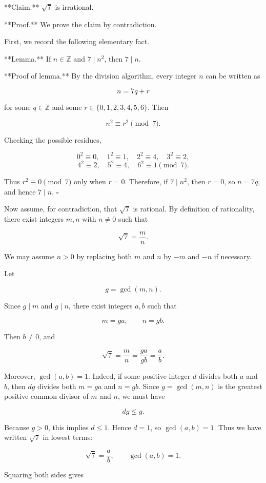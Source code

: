 **Claim.** \(\sqrt{7}\) is irrational.

**Proof.** We prove the claim by contradiction.

First, we record the following elementary fact.

**Lemma.** If \(n\in \mathbb Z\) and \(7\mid n^2\), then \(7\mid n\).

**Proof of lemma.** By the division algorithm, every integer \(n\) can be written as

\[
n=7q+r
\]

for some \(q\in \mathbb Z\) and some \(r\in \{0,1,2,3,4,5,6\}\). Then

\[
n^2 \equiv r^2 \pmod 7.
\]

Checking the possible residues,

\[
0^2\equiv 0,\quad 1^2\equiv 1,\quad 2^2\equiv 4,\quad 3^2\equiv 2,
\]
\[
4^2\equiv 2,\quad 5^2\equiv 4,\quad 6^2\equiv 1 \pmod 7.
\]

Thus \(r^2\equiv 0\pmod 7\) only when \(r=0\). Therefore, if \(7\mid n^2\), then \(r=0\), so \(n=7q\), and hence \(7\mid n\). \(\square\)

Now assume, for contradiction, that \(\sqrt{7}\) is rational. By definition of rationality, there exist integers \(m,n\) with \(n\neq 0\) such that

\[
\sqrt{7}=\frac{m}{n}.
\]

We may assume \(n>0\) by replacing both \(m\) and \(n\) by \(-m\) and \(-n\) if necessary.

Let

\[
g=\gcd(m,n).
\]

Since \(g\mid m\) and \(g\mid n\), there exist integers \(a,b\) such that

\[
m=ga,\qquad n=gb.
\]

Then \(b\neq 0\), and

\[
\sqrt{7}=\frac{m}{n}=\frac{ga}{gb}=\frac{a}{b}.
\]

Moreover, \(\gcd(a,b)=1\). Indeed, if some positive integer \(d\) divides both \(a\) and \(b\), then \(dg\) divides both \(m=ga\) and \(n=gb\). Since \(g=\gcd(m,n)\) is the greatest positive common divisor of \(m\) and \(n\), we must have

\[
dg\le g.
\]

Because \(g>0\), this implies \(d\le 1\). Hence \(d=1\), so \(\gcd(a,b)=1\). Thus we have written \(\sqrt{7}\) in lowest terms:

\[
\sqrt{7}=\frac{a}{b},\qquad \gcd(a,b)=1.
\]

Squaring both sides gives

